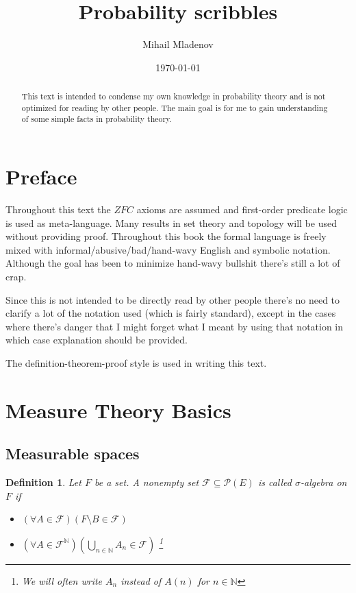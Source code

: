 \documentclass[a4paper]{amsart}
\newtheorem{deff}{Definition}
\newcommand{\pow}[1]{\mathscr{P}\left(#1\right)}
\newcommand{\NN}{\mathbb{N}}
\begin{document}
	
\author{Mihail Mladenov}
\title{Probability scribbles}
\date{\today}
 	
\begin{abstract}
    This text is intended to condense my own knowledge in probability theory and is not optimized for reading by other people. The main goal is for me to gain understanding of some simple facts in probability theory.
\end{abstract}

\maketitle

\tableofcontents
\newpage

\section{Preface}

Throughout this text the $ZFC$ axioms are assumed and 
first-order predicate logic is used as meta-language. Many 
results in set theory and topology will be used without 
providing proof. Throughout this book the formal language is 
freely mixed with informal/abusive/bad/hand-wavy English 
and symbolic notation. Although the goal has been to 
minimize hand-wavy bullshit there's still a lot of crap. 

Since this is not intended to be directly read by other people 
there's no need to clarify a lot of the notation used (which is fairly standard),
except in the cases where there's danger that I might forget 
what I meant by using that notation in which case 
explanation should be provided.

The definition-theorem-proof style is used in writing this text.


\section{Measure Theory Basics}

\subsection{Measurable spaces}

\begin{deff}
    Let $F$ be a set. A nonempty set $\mathcal{F} \subseteq 
    \pow{E}$ is called $\sigma$-algebra on $F$ if
    
    \begin{itemize}
        \item $\left(\forall A \in \mathcal{F}\right)  \left( F 
        \setminus B \in \mathcal{F} \right)$
        \item $\left(\forall A \in \mathcal{F}^\NN\right) \left( 
        \bigcup\limits_{n\in \NN} A_n \in \mathcal{F} \right) $   
        \footnote{We will often write $A_n$ instead of $A(n)$ 
        for $n \in \NN$}
    \end{itemize}
\end{deff}
\end{document}
